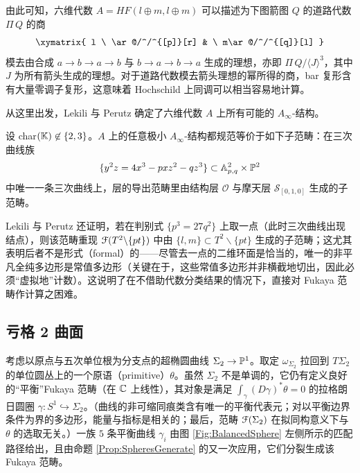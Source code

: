 
由此可知，六维代数 $A = HF(l \oplus m, l \oplus m)$ 可以描述为下图箭图 $Q$ 的道路代数 $\Pi\,Q$ 的商
\begin{equation*}
\xymatrix{
 l \ \ar@/^/^{[p]}[r] & \ m\ar@/^/^{[q]}[l]
}
\end{equation*}
模去由合成 $a\rightarrow b\rightarrow a \rightarrow b$ 与 $b\rightarrow a \rightarrow b \rightarrow a$ 生成的理想，亦即 $\Pi\,Q / \langle J\rangle^3$，其中 $J$ 为所有箭头生成的理想。对于道路代数模去箭头理想的幂所得的商，bar 复形含有大量零调子复形，这意味着 Hochschild 上同调可以相当容易地计算。

从这里出发，Lekili 与 Perutz \cite{LekiliPerutz} 确定了六维代数 $A$ 上所有可能的 $A_{\infty}$-结构。


\begin{Theorem}\label{Thm:LPelliptic}
设 char$(\mathbb{K}) \not\in \{2,3\}$。$A$ 上的任意极小 $A_{\infty}$-结构都规范等价于如下子范畴：在三次曲线族
\[
\{y^2z = 4x^3 - pxz^2 - qz^3 \} \subset \mathbb{A}^2_{p,q}  \times \mathbb{P}^2
\]
中唯一一条三次曲线上，层的导出范畴里由结构层 $\mathcal{O}$ 与摩天层 $\mathcal{S}_{[0,1,0]}$ 生成的子范畴。
\end{Theorem}

Lekili 与 Perutz 还证明，若在判别式 $\{p^3 = 27 q^2\}$ 上取一点（此时三次曲线出现结点），则该范畴重现 $\EuScript{F}(T^2 \backslash \{pt\})$ 中由 $\{l,m\} \subset T^2\backslash \{pt\}$ 生成的子范畴；这尤其表明后者不是形式（formal）的——尽管去一点的二维环面是恰当的，唯一的非平凡全纯多边形是常值多边形（关键在于，这些常值多边形并非横截地切出，因此必须“虚拟地”计数）。这说明了在不借助代数分类结果的情况下，直接对 Fukaya 范畴作计算之困难。

\subsection{亏格 2 曲面\label{Subsec:genus2}} 考虑以原点与五次单位根为分支点的超椭圆曲线 $\Sigma_2 \rightarrow \mathbb{P}^1$。取定 $\omega_{\Sigma_2}$ 拉回到 $T\Sigma_2$ 的单位圆丛上的一个原语（primitive）$\theta$。虽然 $\Sigma_2$ 不是单调的，它仍有定义良好的“平衡”Fukaya 范畴（在 $\mathbb{C}$ 上线性），其对象是满足 $\int_{\gamma} (D\gamma)^*\theta = 0$ 的拉格朗日圆圈 $\gamma: S^1 \hookrightarrow \Sigma_2$。（曲线的非可缩同痕类含有唯一的平衡代表元；对以平衡边界条件为界的多边形，能量与指标是相关的；最后，范畴 $\EuScript{F}(\Sigma_2)$ 在拟同构意义下与 $\theta$ 的选取无关。）一族 $5$ 条平衡曲线 $\gamma_i$ 由图 \ref{Fig:BalancedSphere} 左侧所示的匹配路径给出，且由命题 \ref{Prop:SpheresGenerate} 的又一次应用，它们分裂生成该 Fukaya 范畴。

